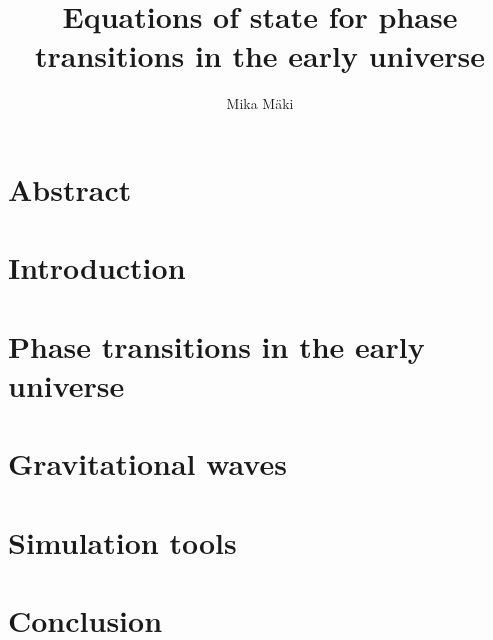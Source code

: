 \documentclass[a4paper]{report}
\title{Equations of state for phase transitions in the early universe}
\author{Mika Mäki}
\begin{document}
\maketitle

\tableofcontents
\clearpage
\listoffigures
\clearpage
\listoftables
\clearpage

\listoftodos
\clearpage

\chapter*{Abstract}


\chapter{Introduction}
\label{ch:introduction}


\chapter{Phase transitions in the early universe}
\label{ch:pt}


\chapter{Gravitational waves}
\label{ch:gw}


\chapter{Simulation tools}
\label{ch:simulation}


\chapter{Conclusion}
\label{ch:conclusion}


\printbibliography[heading=bibintoc]


\end{document}
